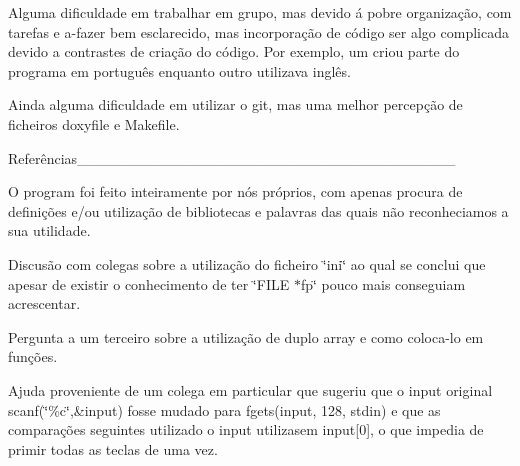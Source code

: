 Alguma dificuldade em trabalhar em grupo, mas devido á pobre organização, com tarefas e a-\/fazer bem esclarecido, mas incorporação de código ser algo complicada devido a contrastes de criação do código. Por exemplo, um criou parte do programa em português enquanto outro utilizava inglês.

Ainda alguma dificuldade em utilizar o git, mas uma melhor percepção de ficheiros doxyfile e Makefile.

Referências\+\_\+\+\_\+\+\_\+\+\_\+\+\_\+\+\_\+\+\_\+\+\_\+\+\_\+\+\_\+\+\_\+\+\_\+\+\_\+\+\_\+\+\_\+\+\_\+\+\_\+\+\_\+\+\_\+\+\_\+\+\_\+\+\_\+\+\_\+\+\_\+\+\_\+\+\_\+\+\_\+\+\_\+\+\_\+\+\_\+\+\_\+\+\_\+\+\_\+\+\_\+\+\_\+\+\_\+

O program foi feito inteiramente por nós próprios, com apenas procura de definições e/ou utilização de bibliotecas e palavras das quais não reconheciamos a sua utilidade.

Discusão com colegas sobre a utilização do ficheiro \char`\"{}ini\char`\"{} ao qual se conclui que apesar de existir o conhecimento de ter \char`\"{}\+F\+I\+L\+E $\ast$fp\char`\"{} pouco mais conseguiam acrescentar.

Pergunta a um terceiro sobre a utilização de duplo array e como coloca-\/lo em funções.

Ajuda proveniente de um colega em particular que sugeriu que o input original scanf(\char`\"{}\%c\char`\"{},\&input) fosse mudado para fgets(input, 128, stdin) e que as comparações seguintes utilizado o input utilizasem input\mbox{[}0\mbox{]}, o que impedia de primir todas as teclas de uma vez. 
